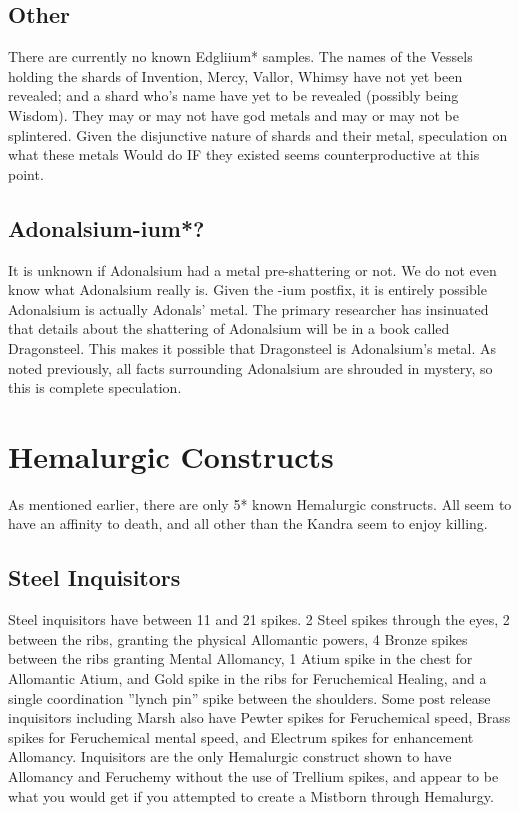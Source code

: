 \documentclass[conference]{IEEEtran}
\newcommand{\n}{\hfill\break}
\begin{document}
\subsection*{\textbf{Other}}
There are currently no known Edgliium* samples.
The names of the Vessels holding the shards of Invention, Mercy, Vallor, Whimsy have not yet been revealed; and a shard who's name have yet to be revealed (possibly being Wisdom).  They may or may not have god metals and may or may not be splintered.  Given the disjunctive nature of shards and their metal, speculation on what these metals Would do IF they existed seems counterproductive at this point.  
\n
\subsection*{\textbf{Adonalsium-ium}*?}
It is unknown if Adonalsium had a metal pre-shattering or not.  We do not even know what Adonalsium really is.  Given the -ium postfix, it is entirely possible Adonalsium is actually Adonals' metal.  The primary researcher has insinuated that details about the shattering of Adonalsium will be in a book called Dragonsteel.  This makes it possible that Dragonsteel is Adonalsium's metal.
As noted previously, all facts surrounding Adonalsium are shrouded in mystery, so this is complete speculation.
\\

\section{\textbf{Hemalurgic Constructs}}
As mentioned earlier, there are only 5* known Hemalurgic constructs.  All seem to have an affinity to death,\cite{WoA-CH19}\cite{WoF}\cite{HoA-CH69}\cite{SoS-CH21}\cite{TFE-EP}\cite{WoA-CH11}\cite{TFE-CH34} and all other than the Kandra seem to enjoy killing.\cite{HoA-CH11}
\subsection*{\textbf{Steel Inquisitors}}
Steel inquisitors have between 11 and 21 spikes.\cite{TFE-EP}\cite{HoA-CH13}  2 Steel spikes through the eyes,\cite{TFE-CH2} 2 between the ribs, granting the physical Allomantic powers,\cite{HoA-CH5} 4 Bronze spikes between the ribs granting Mental Allomancy,\cite{HoA-CH13} 1 Atium spike in the chest for Allomantic Atium, and Gold spike in the ribs for Feruchemical Healing,\cite{HoA-CH72} and a single coordination ''lynch pin'' spike between the shoulders.\cite{TFE-CH38}\cite{ARS-TLM} Some post release inquisitors including Marsh also have Pewter spikes for Feruchemical speed,\cite{HoA-CH5} Brass spikes for Feruchemical mental speed,\cite{IN-Ms} and Electrum spikes for enhancement Allomancy.\cite{HoA-CH72}  Inquisitors are the only Hemalurgic construct shown to have Allomancy and Feruchemy without the use of Trellium spikes, and appear to be what you would get if you attempted to create a Mistborn through Hemalurgy.
\end{document}
